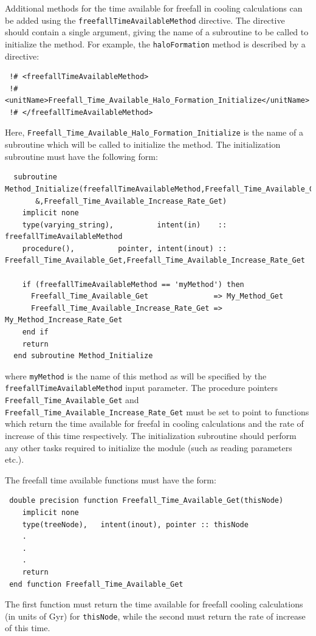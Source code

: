 Additional methods for the time available for freefall in cooling calculations can be added using the {\tt freefallTimeAvailableMethod} directive. The directive should contain a single argument, giving the name of a subroutine to be called to initialize the method. For example, the {\tt haloFormation} method is described by a directive:
\begin{verbatim}
 !# <freefallTimeAvailableMethod>
 !#  <unitName>Freefall_Time_Available_Halo_Formation_Initialize</unitName>
 !# </freefallTimeAvailableMethod>
\end{verbatim}
Here, {\tt Freefall\_Time\_Available\_Halo\_Formation\_Initialize} is the name of a subroutine which will be called to initialize the method. The initialization subroutine must have the following form:
\begin{verbatim}
  subroutine Method_Initialize(freefallTimeAvailableMethod,Freefall_Time_Available_Get&
       &,Freefall_Time_Available_Increase_Rate_Get)
    implicit none
    type(varying_string),          intent(in)    :: freefallTimeAvailableMethod
    procedure(),          pointer, intent(inout) :: Freefall_Time_Available_Get,Freefall_Time_Available_Increase_Rate_Get
    
    if (freefallTimeAvailableMethod == 'myMethod') then
      Freefall_Time_Available_Get               => My_Method_Get
      Freefall_Time_Available_Increase_Rate_Get => My_Method_Increase_Rate_Get
    end if
    return
  end subroutine Method_Initialize
\end{verbatim}
where {\tt myMethod} is the name of this method as will be specified by the {\tt freefallTimeAvailableMethod} input parameter. The procedure pointers {\tt Freefall\_Time\_Available\_Get} and {\tt Freefall\_Time\_Available\_Increase\_Rate\_Get} must be set to point to functions which return the time available for freefal in cooling calculations and the rate of increase of this time respectively. The initialization subroutine should perform any other tasks required to initialize the module (such as reading parameters etc.).

The freefall time available functions must have the form:
\begin{verbatim}
 double precision function Freefall_Time_Available_Get(thisNode)
    implicit none
    type(treeNode),   intent(inout), pointer :: thisNode
    .
    .
    .
    return
 end function Freefall_Time_Available_Get
\end{verbatim}
The first function must return the time available for freefall cooling calculations (in units of Gyr) for {\tt thisNode}, while the second must return the rate of increase of this time. 

